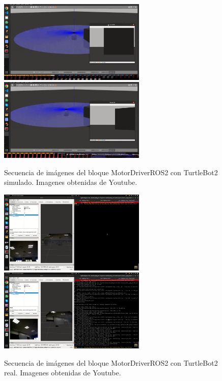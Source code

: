 \begin{figure} [H]
  \begin{center}
      \includegraphics[width=7cm]{figs/c4/motorS1.png}
      \includegraphics[width=7cm]{figs/c4/motorS2.png}
  \end{center}
  \caption[Secuencia bloque cámara ROS2 simulado]{Secuencia de imágenes del bloque MotorDriverROS2 con TurtleBot2 simulado. Imagenes obtenidas de Youtube\footnotemark.}
  \label{fig:vid_motS}
\end{figure}

\begin{figure} [H]
  \begin{center}
      \includegraphics[width=7cm]{figs/c4/motorR1.png}
      \includegraphics[width=7cm]{figs/c4/motorR2.png}
  \end{center}
  \caption[Secuencia bloque MotorDriverROS2 real]{Secuencia de imágenes del bloque MotorDriverROS2 con TurtleBot2 real. Imagenes obtenidas de Youtube\footnotemark.}
  \label{fig:vid_motR}
\end{figure}

